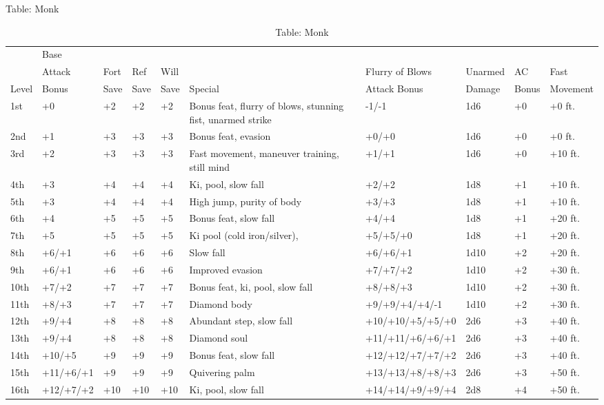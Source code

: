 Table: Monk
\begin{table}[]
\sffamily
\setlength{\tabcolsep}{1pt}
\caption{Table: Monk}
\begin{tabularx}{\linewidth}{lllllXllll}
      & Base   &      &      &      &         &                 &         &       & \\
      & Attack & Fort & Ref  & Will &         & Flurry of Blows & Unarmed & AC    & Fast\\
Level & Bonus  & Save & Save & Save & Special &  Attack Bonus   &  Damage & Bonus & Movement\\
\hline
1st & +0 & +2 & +2 & +2 & Bonus feat, flurry of blows, stunning fist, unarmed strike & -1/-1 & 1d6 & +0 & +0 ft.\\
2nd & +1 & +3 & +3 & +3 & Bonus feat, evasion & +0/+0 & 1d6 & +0 & +0 ft.\\
3rd & +2 & +3 & +3 & +3 & Fast movement, maneuver training, still mind & +1/+1 & 1d6 & +0 & +10 ft.\\
4th & +3 & +4 & +4 & +4 & Ki,  pool, slow fall & +2/+2 & 1d8 & +1 & +10 ft.\\
5th & +3 & +4 & +4 & +4 & High jump, purity of body & +3/+3 & 1d8 & +1 & +10 ft.\\
6th & +4 & +5 & +5 & +5 & Bonus feat, slow fall & +4/+4 & 1d8 & +1 & +20 ft.\\
7th & +5 & +5 & +5 & +5 & Ki pool (cold iron/silver),  & +5/+5/+0 & 1d8 & +1 & +20 ft.\\
8th & +6/+1 & +6 & +6 & +6 & Slow fall & +6/+6/+1 & 1d10 & +2 & +20 ft.\\
9th & +6/+1 & +6 & +6 & +6 & Improved evasion & +7/+7/+2 & 1d10 & +2 & +30 ft.\\
10th & +7/+2 & +7 & +7 & +7 & Bonus feat, ki,  pool, slow fall & +8/+8/+3 & 1d10 & +2 & +30 ft.\\
11th & +8/+3 & +7 & +7 & +7 & Diamond body & +9/+9/+4/+4/-1 & 1d10 & +2 & +30 ft.\\
12th & +9/+4 & +8 & +8 & +8 & Abundant step, slow fall & +10/+10/+5/+5/+0 & 2d6 & +3 & +40 ft.\\
13th & +9/+4 & +8 & +8 & +8 & Diamond soul & +11/+11/+6/+6/+1 & 2d6 & +3 & +40 ft.\\
14th & +10/+5 & +9 & +9 & +9 & Bonus feat, slow fall & +12/+12/+7/+7/+2 & 2d6 & +3 & +40 ft.\\
15th & +11/+6/+1 & +9 & +9 & +9 & Quivering palm & +13/+13/+8/+8/+3 & 2d6 & +3 & +50 ft.\\
16th & +12/+7/+2 & +10 & +10 & +10 & Ki,  pool, slow fall & +14/+14/+9/+9/+4 & 2d8 & +4 & +50 ft.\\

\end{tabularx}
\end{table}
